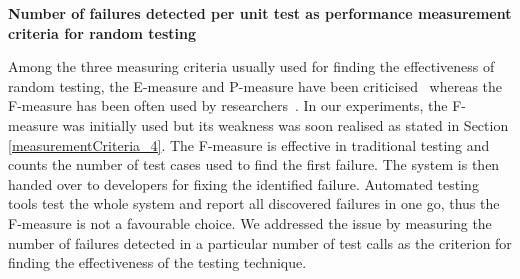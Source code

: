  
    







\textbf{Number of failures detected per unit test as performance measurement criteria for random testing}

Among the three measuring criteria usually used for finding the effectiveness of random testing, the E-measure and P-measure have been criticised~\cite{chen2005adaptive, chen2007quasi, chan2006restricted} whereas the F-measure has been often used by researchers~\cite{chen2004statistical, chen1996expected}. In our experiments, the F-measure was initially used but its weakness was soon realised as stated in Section \ref{measurementCriteria_4}. The F-measure is effective in traditional testing and counts the number of test cases used to find the first failure. The system is then handed over to developers for fixing the identified failure. Automated testing tools test the whole system and report all discovered failures in one go, thus the F-measure is not a favourable choice. We addressed the issue by measuring the number of failures detected in a particular number of test calls as the criterion for finding the effectiveness of the testing technique.\\

